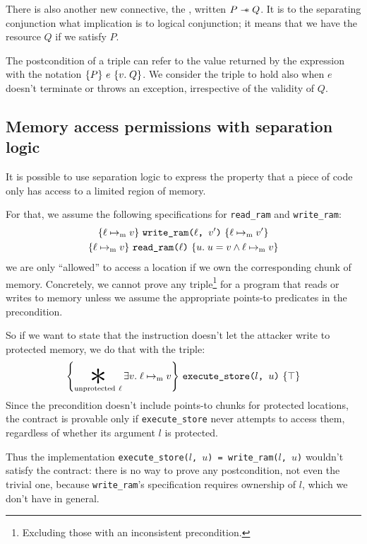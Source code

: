 There is also another new connective, the , written \(P \mathrel{-\!\!\ast} Q\). It is to the separating conjunction what implication is to logical conjunction; it means that we have the resource \(Q\) if we satisfy \(P\).

The postcondition of a triple can refer to the value returned by the expression with the notation \(\hoare{P}{e}[v]{Q}\). We consider the triple to hold also when \(e\) doesn't terminate or throws an exception, irrespective of the validity of \(Q\).

\subsection{Memory access permissions with separation logic}

It is possible to use separation logic to express the property that a piece of code only has access to a limited region of memory.

For that, we assume the following specifications for \texttt{read\_ram} and \texttt{write\_ram}:
\begin{gather*}
  \hoare{\ell \ptom v}{\texttt{write\_ram($\ell$, $v'$)}}{\ell \ptom v'} \\
  \hoare{\ell \ptom v}{\texttt{read\_ram($\ell$)}}[u]{u = v \wedge \ell \ptom v}
\end{gather*}
we are only ``allowed'' to access a location if we own the corresponding chunk of memory. Concretely, we cannot prove any triple\footnote{Excluding those with an inconsistent precondition.} for a program that reads or writes to memory unless we assume the appropriate points-to predicates in the precondition.

So if we want to state that the  instruction doesn't let the attacker write to protected memory, we do that with the triple:
\[ \hoare{\bigast_{\smash{\mathrm{unprotected}~\ell}} \exists v.\; \ell \ptom v}{\texttt{execute\_store($l$, $u$)}}{\top}\]
Since the precondition doesn't include points-to chunks for protected locations, the contract is provable only if \texttt{execute\_store} never attempts to access them, regardless of whether its argument \(l\) is protected.

Thus the implementation \texttt{execute\_store(\(l\), \(u\)) = write\_ram(\(l\), \(u\))} wouldn't satisfy the contract: there is no way to prove any postcondition, not even the trivial one, because \texttt{write\_ram}'s specification requires ownership of \(l\), which we don't have in general.

